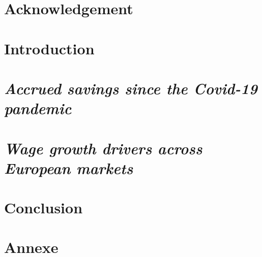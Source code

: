 \documentclass[15pt, english]{article}
\begin{document}

\newpage


\pagestyle{fancy}
\fancyhead[L]{}
\fancyhead[R]{}
\thispagestyle{empty}
\tableofcontents
\break
\setcounter{page}{1}
\section*{Acknowledgement}

\newpage
{}
\section*{Introduction}

\newpage

\pagestyle{fancy}
\fancyhead[L]{\leftmark}
\fancyhead[R]{}

\section{\textit{Accrued savings since the Covid-19 pandemic}}

\newpage

\section{\textit{Wage growth drivers across European markets}}

\newpage

\section*{Conclusion}

\newpage

\pagestyle{fancy}
\fancyhead[L]{}
\fancyhead[R]{}
\printbibliography

\section*{Annexe}


\pagestyle{empty}

\newpage

\newpage

%
\end{document}
